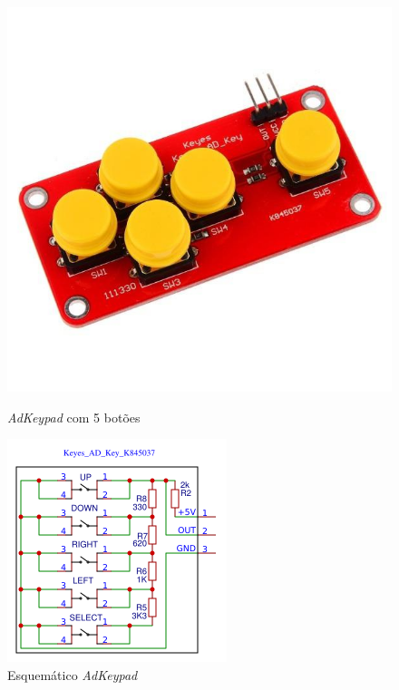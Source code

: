        \begin{figure}[H]
          \centering
          \begin{minipage}[b]{0.3\textwidth}
            \includegraphics[width=\textwidth]{figuras/adkeypad.jpg}
            \caption{\textit{AdKeypad} com 5 botões}
            \label{fig:keypad_ft}
          \end{minipage}
          \hspace{2cm}
          \begin{minipage}[b]{0.3\textwidth}
            \includegraphics[width=\textwidth]{figuras/adkeypad_schematic.png}
            \caption{Esquemático \textit{AdKeypad}}
            \label{fig:keypad_esq}
          \end{minipage}
        \end{figure}
        
